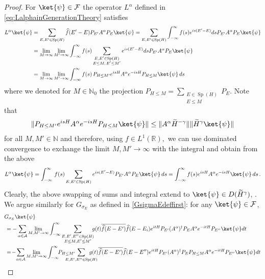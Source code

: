 \documentclass[11pt]{amsart}
\newcommand{\1}{\mathbbm{1}}
\newcommand{\R}{\mathbb{R}}
\newcommand{\N}{\mathbb{N}}
\newcommand{\E}{\mathbb{E}}
\newcommand{\spec}{\operatorname{Sp}}
\theoremstyle{plain}
\theoremstyle{definition}
\theoremstyle{remark}
\numberwithin{equation}{section}
\begin{document}
\begin{proof}
For $\ket{\psi}\in \mathcal{F}$ the operator $L^\alpha$ defined in \eqref{eq:LalphainGenerationTheory} satisfies 
\begin{align*}
L^\alpha\ket{\psi}&=\sum_{E,E'\in\spec(H) }\widehat{f}(E'-E)P_{E'}A^\alpha P_{E}\ket{\psi}=\sum_{E,E'\in \operatorname{Sp}(H)}\int_{-\infty}^\infty f(s)e^{is(E'-E)}ds P_{E'}A^\alpha P_E\ket{\psi}\\
&= \lim_{M\to \infty} \lim_{M'\to \infty}\int_{-\infty}^\infty f(s) \sum_{\substack{E,E'\in \operatorname{Sp}(H)\\E\le M,\,E'\le M'}}e^{is(E'-E)}ds P_{E'}A^\alpha P_E\ket{\psi} \\
&= \lim_{M\to \infty} \lim_{M'\to \infty} \int_{-\infty}^\infty f(s)\, P_{H\le M'}e^{isH}A^\alpha e^{-isH} P_{H\le M}\ket{\psi}\,ds  
\end{align*}
where we denoted for $M\in\N_0$ the projection $ P_{H\le M} =  \sum_{\substack{E\in \operatorname{Sp}(H)\\E\le M}}P_E.$ Note that
\begin{align*}
   \| P_{H\le M'}e^{isH}A^\alpha e^{-isH} P_{H\le M}\ket{\psi}\| \le \|A^\alpha\widetilde H^{-\gamma}\| \|\widetilde H^\gamma\ket{\psi}\|
\end{align*}
for all $M,M'\in\N$ and therefore, using $f\in L^1(\R),$ we can use dominated convergence to exchange the limit $M,M'\to\infty$ with the integral and obtain from the above\begin{align*}
L^\alpha\ket{\psi}=\int_{-\infty}^\infty\,f(s)\sum_{E,E'\in\operatorname{Sp}(H)}e^{is(E'-E)}P_{E'}A^\alpha P_E\ket{\psi}\,ds=\int_{-\infty}^\infty f(s)e^{isH}A^\alpha e^{-isH}\ket{\psi}\,ds\,.
\end{align*}
Clearly, the above swapping of sums and integral extend to $\ket{\psi}\in D(\widetilde{H}^{\gamma})$, . We argue similarly for $G_{\sigma_E}$ as defined in \eqref{GsigmaEdeffirst}: for any $\ket{\psi}\in \mathcal{F}$,
\begin{align*}
&G_{\sigma_E}\ket{\psi}\\
&\, =-\sum_{\alpha\in\mathcal{A}}\lim_{M,M'\to\infty}\int_{-\infty}^\infty\sum_{\substack{E,E',E''\in\operatorname{Sp}(H)\\E\le M,E'\le M'}}\!\!\!g(t)\overline{\widehat{f}(E-E')}\widehat{f}(E-E_i)e^{itH}P_{E'}(A^\alpha)^\dagger P_{E}A^\alpha e^{-itH}P_{E''}\ket{\psi}dt\\
&\, =\!-\!\sum_{\alpha\in\mathcal{A}}\lim_{M,M'\to\infty}\int_{-\infty}^\infty \!\!P_{H\le M'}\!\!\!\!\!\!\!\!\!\!\!\!\sum_{E,E',E''\in\operatorname{Sp}(H)}\!\!\!\!\!\!\!\!\!\!g(t)\overline{\widehat{f}(E-E')}\widehat{f}(E-E'')e^{itH}P_{E'}(A^\alpha)^\dagger P_{E}P_{H\le M}A^\alpha e^{-itH}P_{E''}\ket{\psi}dt\\

\end{align*}
\end{proof}
\end{document}
